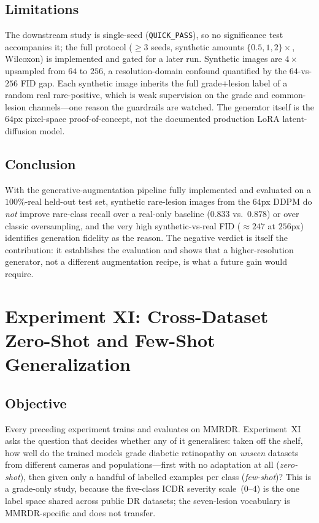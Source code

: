 \documentclass[journal,twoside,web]{ieeecolor}
\begin{document}
\subsection{Limitations}
The downstream study is single-seed (\texttt{QUICK\_PASS}), so no significance test
accompanies it; the full protocol ($\geq3$ seeds, synthetic amounts
$\{0.5,1,2\}\times$, Wilcoxon) is implemented and gated for a later run. Synthetic
images are $4\times$ upsampled from $64$ to $256$, a resolution-domain confound
quantified by the $64$-vs-$256$ FID gap. Each synthetic image inherits the full
grade$+$lesion label of a random real rare-positive, which is weak supervision on the
grade and common-lesion channels---one reason the guardrails are watched. The
generator itself is the $64$px pixel-space proof-of-concept, not the documented
production LoRA latent-diffusion model.

\subsection{Conclusion}
With the generative-augmentation pipeline fully implemented and evaluated on a
$100\%$-real held-out test set, synthetic rare-lesion images from the $64$px DDPM do
\emph{not} improve rare-class recall over a real-only baseline ($0.833$ vs.\ $0.878$)
or over classic oversampling, and the very high synthetic-vs-real FID ($\approx247$
at $256$px) identifies generation fidelity as the reason. The negative verdict is
itself the contribution: it establishes the evaluation and shows that a
higher-resolution generator, not a different augmentation recipe, is what a future
gain would require.

\section{Experiment XI: Cross-Dataset Zero-Shot and Few-Shot Generalization}
\label{sec:exp11}

\subsection{Objective}
Every preceding experiment trains and evaluates on MMRDR. Experiment~XI asks the
question that decides whether any of it generalises: taken off the shelf, how well
do the trained models grade diabetic retinopathy on \emph{unseen} datasets from
different cameras and populations---first with no adaptation at all (\emph{zero-shot}),
then given only a handful of labelled examples per class (\emph{few-shot})? This is a
grade-only study, because the five-class ICDR severity scale~($0$--$4$) is the one
label space shared across public DR datasets; the seven-lesion vocabulary is
MMRDR-specific and does not transfer.
\end{document}
